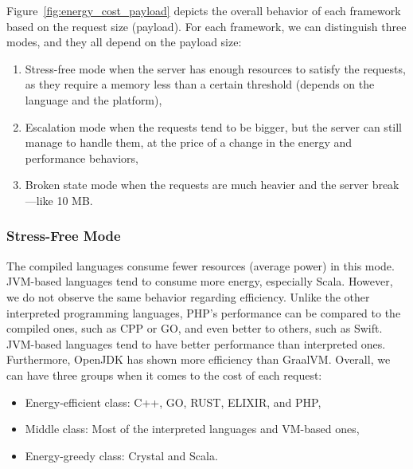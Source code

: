 Figure~\ref{fig:energy_cost_payload} depicts the overall behavior of each framework based on the request size (payload).
For each framework, we can distinguish three modes, and they all depend on the payload size:
\begin{enumerate}
    \item \textsf{Stress-free} mode when the server has enough resources to satisfy the requests, as they require a memory less than a certain threshold (depends on the language and the platform),
    \item \textsf{Escalation} mode when the requests tend to be bigger, but the server can still manage to handle them, at the price of a change in the energy and performance behaviors,
    \item \textsf{Broken state} mode when the requests are much heavier and the server break—like 10 MB.%
\end{enumerate}

\subsubsection{Stress-Free Mode}
The compiled languages consume fewer resources (average power) in this mode.
JVM-based languages tend to consume more energy, especially Scala.
However, we do not observe the same behavior regarding efficiency.
Unlike the other interpreted programming languages, PHP's performance can be compared to the compiled ones, such as CPP or GO, and even better to others, such as Swift.
JVM-based languages tend to have better performance than interpreted ones.
Furthermore, OpenJDK has shown more efficiency than GraalVM.
Overall, we can have three groups when it comes to the cost of each request:
\begin{itemize}
    \item Energy-efficient class: C++, GO, RUST, ELIXIR, and PHP,
    \item Middle class: Most of the interpreted languages and VM-based ones,
    \item Energy-greedy class: Crystal and Scala.
\end{itemize}
